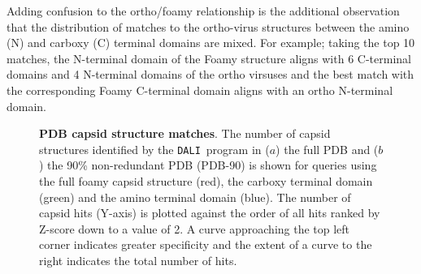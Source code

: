 \documentclass{bmcart}
\newcommand{\DALI}{{\tt DALI}}
\begin{document}
Adding confusion to the ortho/foamy relationship is the additional observation that
the distribution of matches to the ortho-virus structures between the amino (N) and carboxy
(C) terminal domains are mixed.   For example; taking the top 10 matches, the N-terminal domain of the Foamy
structure aligns with 6 C-terminal domains and 4 N-terminal domains of the ortho virsuses
and the best match with the corresponding Foamy C-terminal domain aligns with an ortho N-terminal domain.

\begin{figure}
\centering
{}
\begin{footnotesize}
\caption{
\label{Fig:rocs}
{\bf PDB capsid structure matches}.
The number of capsid structures identified by the \DALI\ program in ($a$) the full PDB and ($b$)
the 90\% non-redundant PDB (PDB-90) is shown for queries using the full foamy capsid
structure (red), the carboxy terminal domain (green) and the amino terminal domain (blue).
The number of capsid hits (Y-axis) is plotted against the order of all hits ranked by Z-score
down to a value of 2.   A curve approaching the top left corner indicates greater specificity
and the extent of a curve to the right indicates the total number of hits.
}
\end{footnotesize}
\end{figure}
\end{document}
